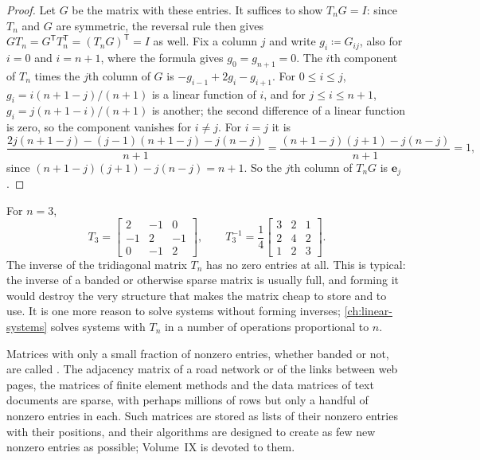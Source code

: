 \begin{proof}
Let $G$ be the matrix with these entries. It suffices to show $T_nG=I$: since $T_n$ and $G$ are symmetric, the reversal rule then gives $GT_n=G^{\mathsf T}T_n^{\mathsf T}=(T_nG)^{\mathsf T}=I$ as well. Fix a column $j$ and write $g_i\coloneqq G_{ij}$, also for $i=0$ and $i=n+1$, where the formula gives $g_0=g_{n+1}=0$. The $i$th component of $T_n$ times the $j$th column of $G$ is $-g_{i-1}+2g_i-g_{i+1}$. For $0\le i\le j$, $g_i=i(n+1-j)/(n+1)$ is a linear function of $i$, and for $j\le i\le n+1$, $g_i=j(n+1-i)/(n+1)$ is another; the second difference of a linear function is zero, so the component vanishes for $i\ne j$. For $i=j$ it is
\[
\frac{2j(n+1-j)-(j-1)(n+1-j)-j(n-j)}{n+1}=\frac{(n+1-j)(j+1)-j(n-j)}{n+1}=1 ,
\]
since $(n+1-j)(j+1)-j(n-j)=n+1$. So the $j$th column of $T_nG$ is $\mathbf e_j$.
\end{proof}

For $n=3$,
\[
T_3=\begin{bmatrix}2&-1&0\\-1&2&-1\\0&-1&2\end{bmatrix},\qquad T_3^{-1}=\frac14\begin{bmatrix}3&2&1\\2&4&2\\1&2&3\end{bmatrix}.
\]
The inverse of the tridiagonal matrix $T_n$ has no zero entries at all. This is typical: the inverse of a banded or otherwise sparse matrix is usually full, and forming it would destroy the very structure that makes the matrix cheap to store and to use. It is one more reason to solve systems without forming inverses; \cref{ch:linear-systems} solves systems with $T_n$ in a number of operations proportional to $n$.

Matrices with only a small fraction of nonzero entries, whether banded or not, are called . The adjacency matrix of a road network or of the links between web pages, the matrices of finite element methods and the data matrices of text documents are sparse, with perhaps millions of rows but only a handful of nonzero entries in each. Such matrices are stored as lists of their nonzero entries with their positions, and their algorithms are designed to create as few new nonzero entries as possible; Volume~IX is devoted to them.

